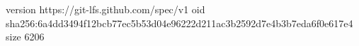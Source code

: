 version https://git-lfs.github.com/spec/v1
oid sha256:6a4dd3494f12bcb77ec5b53d04e96222d211ac3b2592d7e4b3b7eda6f0e617e4
size 6206
